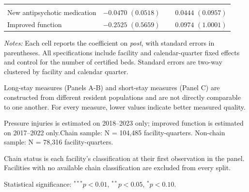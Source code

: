 \documentclass[11pt]{article}
\begin{document}
\begin{table}[!ht]
\begin{threeparttable}
\begin{tabularx}{\textwidth}{@{} l Y Y @{}}
\addlinespace[0.6em]
 \\[2pt]
New antipsychotic medication &  &  \\
Improved function &  &  \\
\bottomrule
\end{tabularx}

\begin{tablenotes}[flushleft]
\footnotesize
\item \textit{Notes:} Each cell reports the coefficient on \textit{post}, with standard errors in parentheses. All specifications include facility and calendar-quarter fixed effects and control for the number of certified beds. Standard errors are two-way clustered by facility and calendar quarter.
\item Long-stay measures (Panels A-B) and short-stay measures (Panel C) are constructed from different resident populations and are not directly comparable to one another. For every measure, lower values indicate better measured quality.
\item Pressure injuries is estimated on 2018--2023 only; improved function is estimated on 2017--2022 only.Chain sample: N = 104,485 facility-quarters. Non-chain sample: N = 78,316 facility-quarters.
\item Chain status is each facility's classification at their first observation in the panel. Facilities with no available chain classification are excluded from every split.
\item Statistical significance: $^{***}p<0.01$, $^{**}p<0.05$, $^{*}p<0.10$.
\end{tablenotes}

\end{threeparttable}
\end{table}
\end{document}
